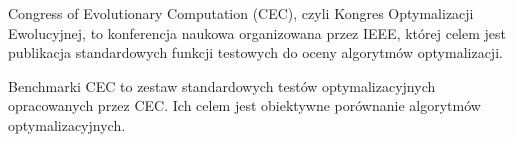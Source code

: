 Congress of Evolutionary Computation (CEC), czyli Kongres Optymalizacji Ewolucyjnej, to konferencja naukowa organizowana przez IEEE, której celem jest publikacja standardowych funkcji testowych do oceny algorytmów optymalizacji.

Benchmarki CEC to zestaw standardowych testów optymalizacyjnych opracowanych przez CEC. Ich celem jest obiektywne porównanie algorytmów optymalizacyjnych.

